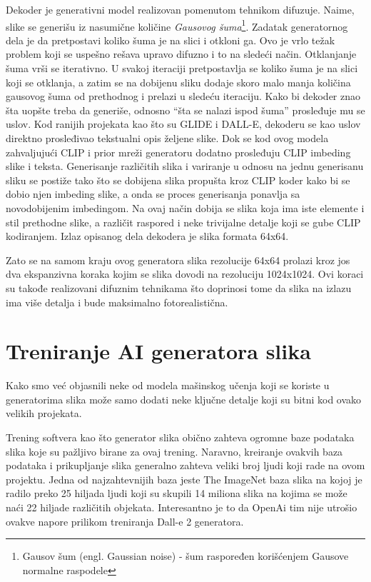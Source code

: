 \documentclass[12pt, letterpaper]{article}
\begin{document}
Dekoder je generativni model realizovan pomenutom tehnikom difuzuje. Naime, slike se generišu iz nasumične količine \textit{Gausovog šuma}\footnote{Gausov šum (engl. Gaussian noise) - šum raspoređen korišćenjem Gausove normalne raspodele}. Zadatak generatornog dela je da pretpostavi koliko šuma je na slici i otkloni ga. Ovo je vrlo težak problem koji se uspešno rešava upravo difuzno i to na sledeći način. Otklanjanje šuma vrši se iterativno\cite{gen1}. U svakoj iteraciji pretpostavlja se koliko šuma je na slici koji se otklanja, a zatim se na dobijenu sliku dodaje skoro malo manja količina gausovog šuma od prethodnog i prelazi u sledeću iteraciju. Kako bi dekoder znao šta uopšte treba da generiše, odnosno “šta se nalazi ispod šuma” prosleđuje mu se uslov. Kod ranijih projekata kao što su GLIDE i DALL-E\cite{openai_glide, openai_dali}, dekoderu se kao uslov direktno prosleđivao tekstualni opis željene slike. Dok se kod ovog modela zahvaljujući CLIP i prior mreži generatoru dodatno prosleđuju CLIP imbeding slike i teksta. Generisanje različitih slika i variranje u odnosu na jednu generisanu sliku se postiže tako što se dobijena slika propušta kroz CLIP koder kako bi se dobio njen imbeding slike, a onda se proces generisanja ponavlja sa novodobijenim imbedingom. Na ovaj način dobija se slika koja ima iste elemente i stil prethodne slike, a različit raspored i neke trivijalne detalje koji se gube CLIP kodiranjem. Izlaz opisanog dela dekodera je slika formata 64x64.

Zato se na samom kraju ovog generatora slika rezolucije 64x64 prolazi kroz jos dva ekspanzivna koraka kojim se slika dovodi na rezoluciju 1024x1024. Ovi koraci su takođe realizovani difuznim tehnikama što doprinosi tome da slika na izlazu ima više detalja i bude maksimalno fotorealistična.\cite{openai_dali}

\pagebreak
\section{Treniranje AI generatora slika}

Kako smo već objasnili neke od modela mašinskog učenja koji se koriste u generatorima slika može samo dodati neke ključne detalje koji su bitni kod ovako velikih projekata.

Trening softvera kao što generator slika obično zahteva ogromne baze podataka slika koje su pažljivo birane za ovaj trening. Naravno, kreiranje ovakvih baza podataka i prikupljanje slika generalno zahteva veliki broj ljudi koji rade na ovom projektu. Jedna od najzahtevnijih baza jeste The ImageNet baza slika na kojoj je radilo preko 25 hiljada ljudi koji su skupili 14 miliona slika na kojima se može naći 22 hiljade različitih objekata. Interesantno je to da OpenAi tim nije utrošio ovakve napore prilikom treniranja Dall-e 2 generatora. \cite{clip}
\end{document}
